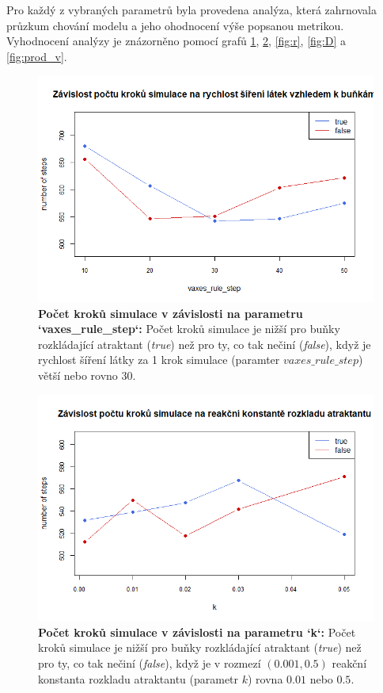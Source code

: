 \documentclass[10pt,a4paper,twocolumn]{article}
\begin{document}
Pro každý z vybraných parametrů byla provedena analýza, která zahrnovala průzkum chování modelu a jeho ohodnocení výše popsanou metrikou. Vyhodnocení analýzy je znázorněno pomocí grafů \ref{fig:vrs}, 
\ref{fig:k}, \ref{fig:r}, \ref{fig:D} a \ref{fig:prod_v}.

\begin{figure}[tb]
  \centering
  \includegraphics[width=0.9\linewidth]{images/vrs.png}
  \caption{\textbf{Počet kroků simulace v závislosti na parametru `vaxes\_rule\_step`:}
  Počet kroků simulace je nižší pro buňky rozkládající atraktant (\textit{true}) než pro ty, co tak nečiní (\textit{false}), když je rychlost šíření látky za 1 krok simulace (paramter $vaxes\_rule\_step$) větší nebo rovno $30$.}
  \label{fig:vrs}
\end{figure}

\begin{figure}[tb]
  \centering
  \includegraphics[width=0.9\linewidth]{images/k.png}
  \caption{\textbf{Počet kroků simulace v závislosti na parametru `k`:}
  Počet kroků simulace je nižší pro buňky rozkládající atraktant (\textit{true}) než pro ty, co tak nečiní (\textit{false}), když je v rozmezí $(0.001,0.5)$ reakční konstanta rozkladu atraktantu (parametr $k$) rovna $0.01$ nebo $0.5$.}
  \label{fig:k}
\end{figure}
\end{document}
